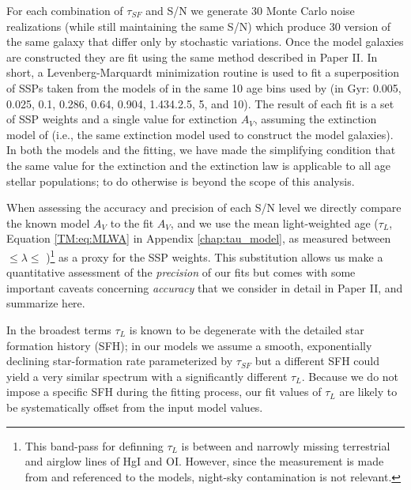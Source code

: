 
For each combination of $\tau_{SF}$ and S/N we generate 30 Monte Carlo
noise realizations (while still maintaining the same S/N) which
produce 30 version of the same galaxy that differ only by stochastic
variations. Once the model galaxies are constructed they are fit using
the same method described in Paper II. In short, a Levenberg-Marquardt
minimization routine is used to fit a superposition of SSPs taken from
the models of \citet{Bruzual03} in the same 10 age bins used by
\citet{Tremonti04} (in Gyr: 0.005, 0.025, 0.1, 0.286, 0.64, 0.904,
1.434.2.5, 5, and 10). The result of each fit is a set of SSP weights
and a single value for extinction $A_V$, assuming the extinction model
of \citet{Charlot00} (i.e., the same extinction model used to
construct the model galaxies). In both the models and the fitting, we
have made the simplifying condition that the same value for the
extinction and the extinction law is applicable to all age stellar
populations; to do otherwise is beyond the scope of this analysis.

When assessing the accuracy and precision of each S/N level we
directly compare the known model $A_V$ to the fit $A_V$, and we use
the mean light-weighted age ($\tau_L$, Equation \ref{TM:eq:MLWA} in
Appendix \ref{chap:tau_model}, as measured between 
$\leq\lambda\leq$ )\footnote{ This band-pass for
  definning $\tau_L$ is between and narrowly missing terrestrial and
  airglow lines of HgI and OI. However, since the measurement is made
  from and referenced to the models, night-sky contamination is not
  relevant.}  as a proxy for the SSP weights. This substitution allows
us make a quantitative assessment of the {\it precision} of our fits
but comes with some important caveats concerning {\it accuracy} that
we consider in detail in Paper II, and summarize here.

In the broadest terms $\tau_L$ is known to be degenerate with the
detailed star formation history (SFH); in our models we assume a
smooth, exponentially declining star-formation rate parameterized by
$\tau_{SF}$ but a different SFH could yield a very similar spectrum
with a significantly different $\tau_L$.  Because we do not impose a
specific SFH during the fitting process, our fit values of $\tau_L$
are likely to be systematically offset from the input model values.

